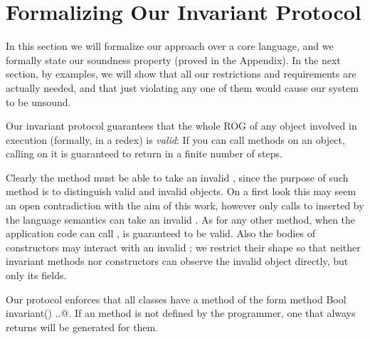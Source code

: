 \saveSpace
\section{Formalizing Our Invariant Protocol}
\label{s:protocol}
\saveSpace
In this section we will formalize our approach over a core language, and we formally state our soundness property (proved in the Appendix).
In the next section, by examples, we will show that all our restrictions and
requirements are actually needed, and that just violating any one of them would cause our system to be unsound.

Our invariant protocol guarantees that the whole ROG of any object involved in execution (formally, in a redex) is \emph{valid}:
If you can call methods on an object, calling \Q@invariant@ on it is guaranteed to return \Q@true@ in a finite number of steps.

Clearly the \Q@invariant@ method must be able to take an invalid \Q@this@, since the purpose of such method is to distinguish valid and invalid objects.
On a first look this may seem an open contradiction
with the aim of this work, however only calls to \Q@invariant@ inserted by the language semantics can take an invalid \Q@this@. As for any other method, when the application code can call \Q@invariant@,
\Q@this@ is guaranteed to be valid.
Also the bodies of constructors may interact with an invalid \Q@this@; we restrict their shape so that neither invariant methods nor constructors can observe the invalid object directly, but only its fields.


Our protocol enforces that all classes have a method of the form \Q@read method Bool invariant() {..}@. If an \Q@invariant@ method is not defined by the programmer, one that always returns \Q@true@ will be generated for them.

